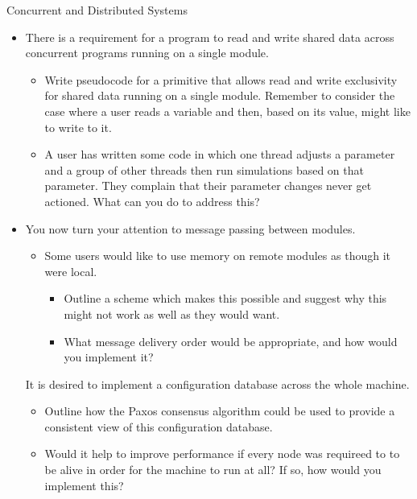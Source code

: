 \documentclass{tripos}  %
\begin{document}
\begin{question}[MockIB,year=2024,paper=1,question=1,author=rrw]{Concurrent and Distributed Systems}
\begin{itemize}
\item There is a requirement for a program to read and write shared data across concurrent programs running on a single module.
  \begin{itemize}
  \item Write pseudocode for a primitive that allows read and write exclusivity for shared data running on a single module. Remember to consider the case where a user reads a variable and then, based on its value, might like to write to it.
  \item A user has written some code in which one thread adjusts a parameter and a group of other threads then run simulations based on that parameter. They complain that their parameter changes never get actioned. What can you do to address this? 
  \end{itemize}
\item You now turn your attention to message passing between modules.
  \begin{itemize}
  \item Some users would like to use memory on remote modules as though it were local.
    \begin{itemize}
    \item Outline a scheme which makes this possible and suggest why this might not work as well as they would want. 
    \item What message delivery order would be appropriate, and how would you implement it? 
    \end{itemize}
  \end{itemize}
  It is desired to implement a configuration database across the whole machine.
  \begin{itemize}
  \item Outline how the Paxos consensus algorithm could be used to provide a consistent view of this configuration database. 
  \item Would it help to improve performance if every node was requireed to to be alive in order for the machine to run at all? If so, how would you implement this? 
    \end{itemize}
\end{itemize}
\end{question}
\end{document}
